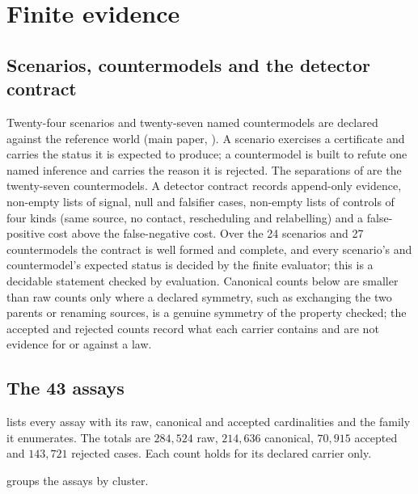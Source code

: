 \section{Finite evidence}
\label{supp:evidence}

\subsection{Scenarios, countermodels and the detector contract}

Twenty-four scenarios and twenty-seven named countermodels are declared against the reference
world (main paper, ). A scenario exercises a certificate and carries the status it
is expected to produce; a countermodel is built to refute one named inference and carries the
reason it is rejected. The separations of  are the twenty-seven
countermodels. A detector contract records append-only evidence, non-empty lists of signal, null
and falsifier cases, non-empty lists of controls of four kinds (same source, no contact,
rescheduling and relabelling) and a false-positive cost above the false-negative cost. Over the
24 scenarios and 27 countermodels the contract is well formed and complete, and every scenario's
and countermodel's expected status is decided by the finite evaluator; this is a decidable
statement checked by evaluation. Canonical counts below are smaller than raw counts only where a
declared symmetry, such as exchanging the two parents or renaming sources, is a genuine symmetry
of the property checked; the accepted and rejected counts record what each carrier contains and
are not evidence for or against a law.

\subsection{The 43 assays}

 lists every assay with its raw, canonical and accepted cardinalities
and the family it enumerates. The totals are $284{,}524$ raw, $214{,}636$ canonical,
$70{,}915$ accepted and $143{,}721$ rejected cases. Each count holds for its declared
carrier only.

 groups the assays by cluster.

